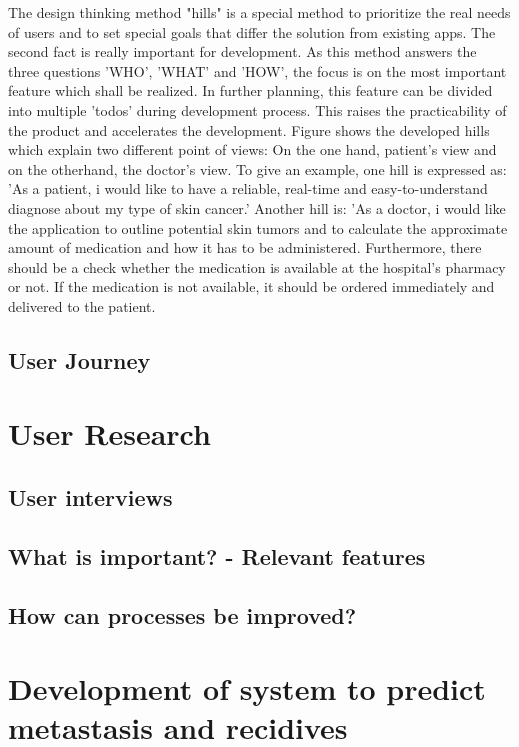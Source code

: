 The design thinking method "hills" is a special method to prioritize the real needs of users and to set special goals that differ the solution from existing apps. The second fact is really important for development. As this method answers the three questions 'WHO', 'WHAT' and 'HOW', the focus is on the most important feature which shall be realized. In further planning, this feature can be divided into multiple 'todos'  during development process. This raises the practicability of the product and accelerates the development. Figure shows the developed hills which explain two different point of views: On the one hand, patient's view and on the otherhand, the doctor's view.
To give an example, one hill is expressed as: 'As a patient, i would like to have a reliable, real-time and easy-to-understand diagnose about my type of skin cancer.'
Another hill is: 'As a doctor, i would like the application to outline potential skin tumors and to calculate the  approximate amount of medication and how it has to be administered. Furthermore, there should be a check whether the medication is available at the hospital's pharmacy or not. If the medication is not available, it should be ordered immediately and delivered to the patient.


\subsection{User Journey}



\section{User Research}
\subsection{User interviews}
\subsection{What is important? - Relevant features}
\subsection{How can processes be improved?}


\section{Development of system to predict metastasis and recidives} 

